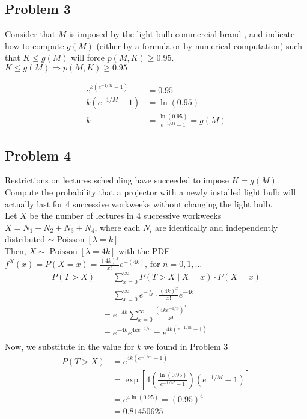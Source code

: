 \documentclass[10pt, letterpaper,]{article}
\begin{document}
		\subsection{Problem 3} Consider that $M$ is imposed by the light bulb commercial brand , and indicate how  to compute $g(M)$ (either by a formula or by numerical computation) such that $K \leq  g(M)$ will force $p(M,K) \geq 0.95$. \\
		$K \leq g(M) \Rightarrow p(M, K) \geq 0.95$
		
		$$
		\begin{aligned}
		e^{k\left(e^{-1 / M}-1\right)}&=0.95 \\
		k\left(e^{-1 / M}-1\right)&=\ln (0.95) \\
		k&= \boxed{\frac{\ln (0.95)}{e^{-1 / M}-1}=g(M)}
		\end{aligned}
		$$
		\subsection{Problem 4} Restrictions on lectures scheduling have succeeded to impose $K = g(M)$. Compute the probability that a projector with a newly installed light bulb will actually last for 4 successive   workweeks without changing the light bulb. \\
		
		Let $X$ be the number of lectures in 4 successive workweeks $X=N_{1}+N_{2}+N_{3}+N_{4}$, where each $N_{i}$ are identically and independently distributed $ \sim \operatorname{Poisson}[\lambda=k]$\\
		
		Then, $X \sim \operatorname{Poisson}[\lambda=4k]$ with the PDF $f^{X}(x)=P(X=x)=\frac{(4k)^{x}}{x !} e^{-(4k)} \text{, for } n=0,1, \ldots $
		$$\begin{aligned}
			P(T>X)&=\sum_{x=0}^{\infty} P(T>X \mid X=x) \cdot P(X=x)\\
			&=\sum_{x=0}^{\infty} e^{-\frac{x}{M}} \cdot \frac{(4 k)^{x}}{x !} e^{-4 k}\\
			&=e^{-4 k} \sum_{x=0}^{\infty} \frac{\left(4 k e^{-1 / n}\right)^{x}}{x !}\\
			&=e^{-4 k} e^{4 k e^{-1 / n}}=e^{4 k\left(e^{-1 / m}-1\right)}\\
		\end{aligned}$$
		Now, we substitute in the value for $k$ we found in Problem 3
		$$\begin{aligned}
		P(T>X)&=e^{4 k\left(e^{-1 / m}-1\right)}\\
		&=\exp \left[4\left(\frac{\ln (0.95)}{e^{-1 / M}-1}\right)\left(e^{-1 / M}-1\right)\right]\\
		&=e^{4 \ln (0.95)}=(0.95)^{4}\\
		&= \boxed{0.81450625}
		\end{aligned}$$
\end{document}

